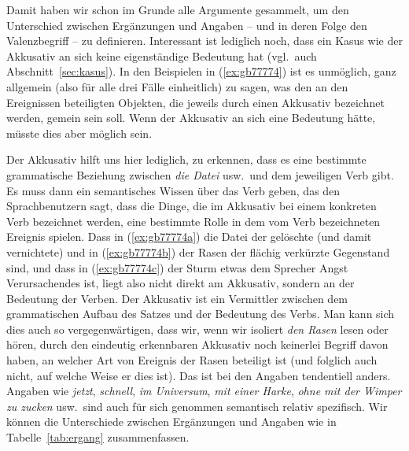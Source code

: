 Damit haben wir schon im Grunde alle Argumente gesammelt, um den Unterschied zwischen Ergänzungen und Angaben -- und in deren Folge den Valenzbegriff -- zu definieren.
Interessant ist lediglich noch, dass ein Kasus wie der Akkusativ an sich keine eigenständige Bedeutung hat (vgl.\ auch Abschnitt~\ref{sec:kasus}).
In den Beispielen in (\ref{ex:gb77774}) ist es unmöglich, ganz allgemein (also für alle drei Fälle einheitlich) zu sagen, was den an den Ereignissen beteiligten Objekten, die jeweils durch einen Akkusativ bezeichnet werden, gemein sein soll.
Wenn der Akkusativ an sich eine Bedeutung hätte, müsste dies aber möglich sein.

\begin{exe}
  \ex\label{ex:gb77774}
  \begin{xlist}
  \end{xlist}
\end{exe}

Der Akkusativ hilft uns hier lediglich, zu erkennen, dass es eine bestimmte grammatische Beziehung zwischen \textit{die Datei} usw.\ und dem jeweiligen Verb gibt.
Es muss dann ein semantisches Wissen über das Verb geben, das den Sprachbenutzern sagt, dass die Dinge, die im Akkusativ bei einem konkreten Verb bezeichnet werden, eine bestimmte Rolle in dem vom Verb bezeichneten Ereignis spielen.
Dass in (\ref{ex:gb77774a}) die Datei der gelöschte (und damit vernichtete) und in (\ref{ex:gb77774b}) der Rasen der flächig verkürzte Gegenstand sind, und dass in (\ref{ex:gb77774c}) der Sturm etwas dem Sprecher Angst Verursachendes ist, liegt also nicht direkt am Akkusativ, sondern an der Bedeutung der Verben.
Der Akkusativ ist ein Vermittler zwischen dem grammatischen Aufbau des Satzes und der Bedeutung des Verbs.
Man kann sich dies auch so vergegenwärtigen, dass wir, wenn wir isoliert \textit{den Rasen} lesen oder hören, durch den eindeutig erkennbaren Akkusativ noch keinerlei Begriff davon haben, an welcher Art von Ereignis der Rasen beteiligt ist (und folglich auch nicht, auf welche Weise er dies ist).
Das ist bei den Angaben tendentiell anders.
Angaben wie \textit{jetzt}, \textit{schnell}, \textit{im Universum}, \textit{mit einer Harke}, \textit{ohne mit der Wimper zu zucken} usw.\ sind auch für sich genommen semantisch relativ spezifisch.
Wir können die Unterschiede zwischen Ergänzungen und Angaben wie in Tabelle~\ref{tab:ergang} zusammenfassen.

